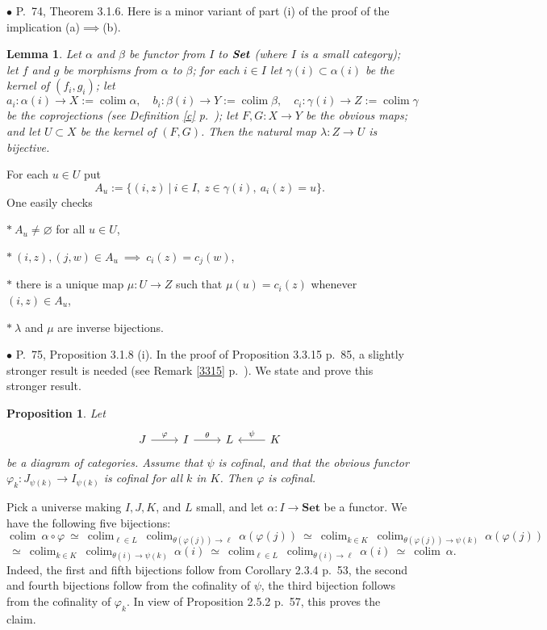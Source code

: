 \documentclass[12pt]{article}
\newtheorem{lem}[thm]{Lemma}
\newtheorem{prop}[thm]{Proposition}
\theoremstyle{remark}%
\newcommand{\bu}{\bullet}
\newcommand{\n}{\noindent}
\newcommand{\Set}{\textbf{Set}}
\newcommand{\p}{\varphi}
\DeclareMathOperator*{\coli}{colim}
\begin{document}

\n$\bu$ P.~74, Theorem 3.1.6. Here is a minor variant of part (i) of the proof of the implication (a)$\implies$(b).\smallskip 

\begin{lem} 
Let $\alpha$ and $\beta$ be functor from $I$ to $\textbf{\em Set}$ (where $I$ is a small category); let $f$ and $g$ be morphisms from $\alpha$ to $\beta$; for each $i\in I$ let $\gamma(i)\subset\alpha(i)$ be the kernel of $(f_i,g_i)$; let 
$$
a_i:\alpha(i)\to X:=\coli\alpha,\quad 
b_i:\beta(i)\to Y:=\coli\beta,\quad 
c_i:\gamma(i)\to Z:=\coli\gamma
$$ 
be the coprojections (see Definition \ref{c} p.~\pageref{c}); let $F,G:X\to Y$ be the obvious maps; and let $U\subset X$ be the kernel of $(F,G)$. Then the natural map $\lambda:Z\to U$ is bijective.
\end{lem}
% 
\n{\em Proof.} For each $u\in U$ put 
$$
A_u:=\{(i,z)\ |\ i\in I,\ z\in\gamma(i),\ a_i(z)=u\}.
$$ 
One easily checks 

\n$*\ A_u\ne\varnothing$ for all $u\in U$,

\n$*\ (i,z),(j,w)\in A_u\ \implies\ c_i(z)=c_j(w)$, 

\n$*$ there is a unique map $\mu:U\to Z$ such that $\mu(u)=c_i(z)$ whenever $(i,z)\in A_u$,

\n$*\ \lambda$ and $\mu$ are inverse bijections. 


\n$\bu$ P.~75, Proposition 3.1.8 (i). In the proof of Proposition 3.3.15 p.~85, a slightly stronger result is needed (see Remark \ref{3315} p.~\pageref{3315}). We state and prove this stronger result. 
%
\begin{prop}\label{318i} 
% 
Let 
$$
\begin{tikzcd}
J\ar{r}{\p}&I\ar{r}{\theta}&L&K\ar{l}[swap]{\psi}
\end{tikzcd}
$$
be a diagram of categories. Assume that $\psi$ is cofinal, and that the obvious functor $\p_k:J_{\psi(k)}\to I_{\psi(k)}$ is cofinal for all $k$ in $K$. Then $\p$ is cofinal. 
% 
\end{prop} 
% 
\n{\em Proof.} Pick a universe making $I,J,K$, and $L$ small, and let $\alpha:I\to\Set$ be a functor. We have the following five bijections:
$$
\coli\ \alpha\circ\p\ \simeq\ 
%
\coli_{\ell\in L}\ \coli_{\theta(\p(j))\to\ell}\ \alpha(\p(j))\ \simeq\ 
%
\coli_{k\in K}\ \coli_{\theta(\p(j))\to\psi(k)}\ \alpha(\p(j))
$$
$$
\ \simeq\ \coli_{k\in K}\ \coli_{\theta(i)\to\psi(k)}\ \alpha(i)\ \simeq\ 
%
\coli_{\ell\in L}\ \coli_{\theta(i)\to\ell}\ \alpha(i)\ \simeq\ 
%
\coli\ \alpha.
$$
Indeed, the first and fifth bijections follow from Corollary 2.3.4 p.~53, the second and fourth bijections follow from the cofinality of $\psi$, the third bijection follows from the cofinality of $\p_k$. In view of Proposition 2.5.2 p.~57, this proves the claim. 
\end{document}
